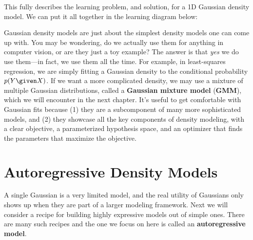 This fully describes the learning problem, and solution, for a 1D Gaussian density model. We can put it all together in the learning diagram below:
\begin{center}
\end{center}
Gaussian density models are just about the simplest density models one can come up with. You may be wondering, do we actually use them for anything in computer vision, or are they just a toy example? The answer is that \textit{yes} we do use them—in fact, we use them all the time. For example, in least-squares regression, we are simply fitting a Gaussian density to the conditional probability $p(Y \given X)$. If we want a more complicated density, we may use a mixture of multiple Gaussian distributions, called a \textbf{Gaussian mixture model} (\textbf{GMM}), which we will encounter in the next chapter. It's useful to get comfortable with Gaussian fits because (1) they are a subcomponent of many more sophisticated models, and (2) they showcase all the key components of density modeling, with a clear objective, a parameterized hypothesis space, and an optimizer that finds the parameters that maximize the objective.

\section{Autoregressive Density Models}\label{sec:generative_models:autoregressive}
A single Gaussian is a very limited model, and the real utility of Gaussians only shows up when they are part of a larger modeling framework. Next we will consider a recipe for building highly expressive models out of simple ones. There are many such recipes and the one we focus on here is called an \textbf{autoregressive model}.


